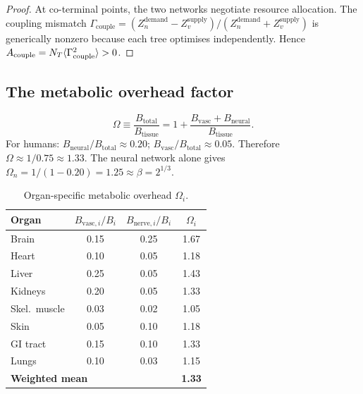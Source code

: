 \documentclass[aps,pre,twocolumn,superscriptaddress,floatfix]{revtex4-2}
\begin{document}
\begin{proof}
At co-terminal points, the two networks negotiate
resource allocation.
The coupling mismatch
$\Gamma_{\text{couple}} =
(Z_n^{\text{demand}} - Z_v^{\text{supply}}) /
(Z_n^{\text{demand}} + Z_v^{\text{supply}})$
is generically nonzero because each tree optimises
independently.
Hence $A_{\text{couple}} = N_T \langle \Gamma_{\text{couple}}^2 \rangle > 0$.
\end{proof}

\subsection{The metabolic overhead factor}

\begin{equation}
  \Omega \equiv \frac{B_{\text{total}}}{B_{\text{tissue}}}
  = 1 + \frac{B_{\text{vasc}} + B_{\text{neural}}}
             {B_{\text{tissue}}}.
  \label{eq:omega-def}
\end{equation}
For humans:
$B_{\text{neural}}/B_{\text{total}} \approx 0.20$;
$B_{\text{vasc}}/B_{\text{total}} \approx 0.05$.
Therefore $\Omega \approx 1/0.75 \approx 1.33$.
The neural network alone gives
$\Omega_n = 1/(1-0.20) = 1.25 \approx \beta = 2^{1/3}$.

\begin{table}[t]
\caption{Organ-specific metabolic overhead $\Omega_i$.}
\label{tab:omega-organ}
\begin{ruledtabular}
\begin{tabular}{lccc}
\textbf{Organ} &
  $B_{\text{vasc},i}/B_i$ &
  $B_{\text{nerve},i}/B_i$ &
  $\Omega_i$ \\
\hline
Brain      & 0.15 & 0.25 & 1.67 \\
Heart      & 0.10 & 0.05 & 1.18 \\
Liver      & 0.25 & 0.05 & 1.43 \\
Kidneys    & 0.20 & 0.05 & 1.33 \\
Skel.\ muscle & 0.03 & 0.02 & 1.05 \\
Skin       & 0.05 & 0.10 & 1.18 \\
GI tract   & 0.15 & 0.10 & 1.33 \\
Lungs      & 0.10 & 0.03 & 1.15 \\
\hline
\multicolumn{3}{l}{\textbf{Weighted mean}} & \textbf{1.33} \\
\end{tabular}
\end{ruledtabular}
\end{table}
\end{document}
